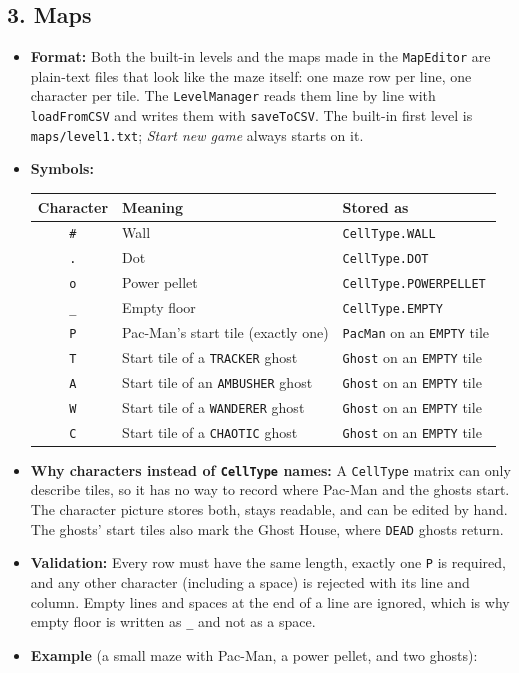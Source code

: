 \documentclass[11pt, a4paper]{article}
\begin{document}
\subsection*{3. Maps}
\label{sec:custom_maps}
\begin{itemize}
    \item \textbf{Format:} Both the built-in levels and the maps made in the \texttt{MapEditor} are plain-text files that look like the maze itself: one maze row per line, one character per tile. The \texttt{LevelManager} reads them line by line with \texttt{loadFromCSV} and writes them with \texttt{saveToCSV}. The built-in first level is \texttt{maps/level1.txt}; \textit{Start new game} always starts on it.
    \item \textbf{Symbols:}

    \vspace{0.2cm}
    \begin{tabular}{@{}cll@{}}
        \toprule
        \textbf{Character} & \textbf{Meaning} & \textbf{Stored as} \\
        \midrule
        \texttt{\#} & Wall & \texttt{CellType.WALL} \\
        \texttt{.} & Dot & \texttt{CellType.DOT} \\
        \texttt{o} & Power pellet & \texttt{CellType.POWERPELLET} \\
        \texttt{\_} & Empty floor & \texttt{CellType.EMPTY} \\
        \texttt{P} & Pac-Man's start tile (exactly one) & \texttt{PacMan} on an \texttt{EMPTY} tile \\
        \texttt{T} & Start tile of a \texttt{TRACKER} ghost & \texttt{Ghost} on an \texttt{EMPTY} tile \\
        \texttt{A} & Start tile of an \texttt{AMBUSHER} ghost & \texttt{Ghost} on an \texttt{EMPTY} tile \\
        \texttt{W} & Start tile of a \texttt{WANDERER} ghost & \texttt{Ghost} on an \texttt{EMPTY} tile \\
        \texttt{C} & Start tile of a \texttt{CHAOTIC} ghost & \texttt{Ghost} on an \texttt{EMPTY} tile \\
        \bottomrule
    \end{tabular}
    \vspace{0.2cm}

    \item \textbf{Why characters instead of \texttt{CellType} names:} A \texttt{CellType} matrix can only describe tiles, so it has no way to record where Pac-Man and the ghosts start. The character picture stores both, stays readable, and can be edited by hand. The ghosts' start tiles also mark the Ghost House, where \texttt{DEAD} ghosts return.
    \item \textbf{Validation:} Every row must have the same length, exactly one \texttt{P} is required, and any other character (including a space) is rejected with its line and column. Empty lines and spaces at the end of a line are ignored, which is why empty floor is written as \texttt{\_} and not as a space.
    \item \textbf{Example} (a small maze with Pac-Man, a power pellet, and two ghosts):


\end{itemize}
\end{document}
